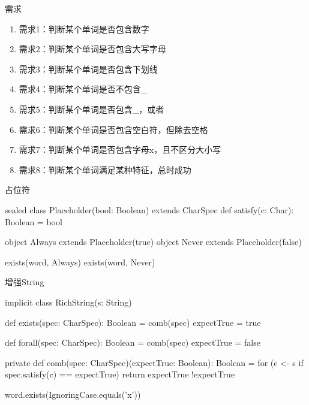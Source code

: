 \begin{frame}{需求}
  \begin{block}{}
    \begin{enumerate}
    \item \alert{需求1}：判断某个单词是否包含数字
    \item \alert{需求2}：判断某个单词是否包含大写字母
    \item \alert{需求3}：判断某个单词是否包含下划线 
    \item \alert{需求4}：判断某个单词是否不包含\_
    \item \alert{需求5}：判断某个单词是否包含\_，或者\*     
    \item \alert{需求6}：判断某个单词是否包含空白符，但除去空格
    \item \alert{需求7}：判断某个单词是否包含字母x，且不区分大小写
    \item<alert@1-> 需求8：判断某个单词满足某种特征，总时成功    
    \end{enumerate}
  \end{block}
\end{frame}

\begin{frame}[fragile]{占位符}
  \begin{scala}
sealed class Placeholder(bool: Boolean) extends CharSpec {
  def satisfy(c: Char): Boolean = bool
}

object Always extends Placeholder(true)
object Never  extends Placeholder(false)

exists(word, Always)
exists(word, Never)
  \end{scala}
\end{frame}

\begin{frame}[fragile]{增强String}
  \begin{scala}
implicit class RichString(s: String) {
  def exists(spec: CharSpec): Boolean = 
    comb(spec) { expectTrue = true  }
  
  def forall(spec: CharSpec): Boolean = 
    comb(spec) { expectTrue = false }

  private def comb(spec: CharSpec)(expectTrue: Boolean): Boolean = {
    for (c <- s if spec.satisfy(c) == expectTrue) 
      return expectTrue
    !expectTrue
  }  
}

word.exists(IgnoringCase.equals('x'))
  \end{scala}
\end{frame}
